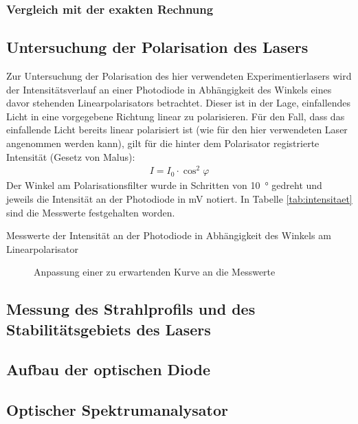 \documentclass[11pt, a4paper]{article}
\numberwithin{equation}{section}
\begin{document}
\subsubsection{Vergleich mit der exakten Rechnung}


\subsection{Untersuchung der Polarisation des Lasers}

Zur Untersuchung der Polarisation des hier verwendeten Experimentierlasers wird der Intensitätsverlauf an einer Photodiode in Abhängigkeit des Winkels eines davor stehenden Linearpolarisators betrachtet.
Dieser ist in der Lage, einfallendes Licht in eine vorgegebene Richtung linear zu polarisieren.
Für den Fall, dass das einfallende Licht bereits linear polarisiert ist (wie für den hier verwendeten Laser angenommen werden kann), gilt für die hinter dem Polarisator registrierte Intensität (Gesetz von Malus):
\begin{align}
I=I_0\cdot\cos^2\varphi
\end{align}
Der Winkel am Polarisationsfilter wurde in Schritten von \SI{10}{\degree} gedreht und jeweils die Intensität an der Photodiode in \si{\milli\volt} notiert.
In Tabelle \ref{tab:intensitaet} sind die Messwerte festgehalten worden.
\begin{table}
	\centering
	
	\caption{Messwerte der Intensität an der Photodiode in Abhängigkeit des Winkels am Linearpolarisator}
	\label{tab:intensitaet}
\end{table}

\begin{figure}
	\centering
	
	\caption{Anpassung einer zu erwartenden Kurve an die Messwerte}
	\label{fig:malus}
\end{figure}

\subsection{Messung des Strahlprofils und des Stabilitätsgebiets des Lasers}

\subsection{Aufbau der optischen Diode}

\subsection{Optischer Spektrumanalysator}
\end{document}
